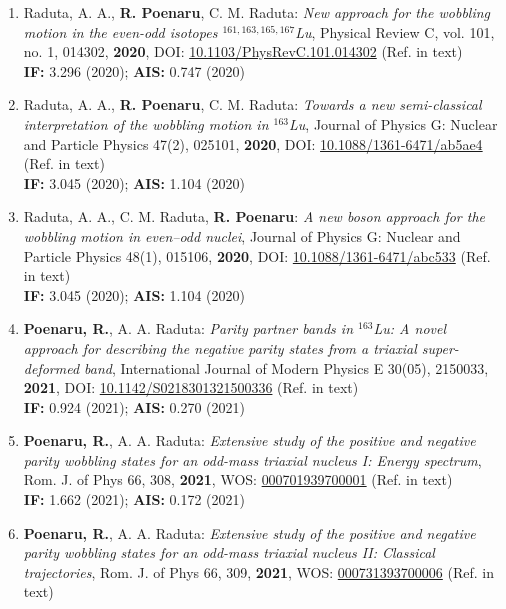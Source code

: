 \begin{enumerate}
    \item Raduta, A. A., \textbf{R. Poenaru}, C. M. Raduta: \emph{New approach for the wobbling motion in the even-odd isotopes $^{161,163,165,167}$Lu}, Physical Review C, vol. 101, no. 1, 014302, \textbf{2020}, DOI: \href{https://link.aps.org/doi/10.1103/PhysRevC.101.014302}{10.1103/PhysRevC.101.014302} (Ref. \cite{raduta2020approach} in text) \\
    \textbf{IF:} 3.296 (2020); \textbf{AIS:} 0.747 (2020)
    \item Raduta, A. A., \textbf{R. Poenaru}, C. M. Raduta: \emph{Towards a new semi-classical interpretation of the wobbling motion in $^{163}$Lu}, Journal of Physics G: Nuclear and Particle Physics 47(2), 025101, \textbf{2020}, DOI: \href{https://iopscience.iop.org/article/10.1088/1361-6471/ab5ae4/meta}{10.1088/1361-6471/ab5ae4} (Ref. \cite{raduta2020towards} in text) \\
    \textbf{IF:} 3.045 (2020); \textbf{AIS:} 1.104 (2020)
    \item Raduta, A. A., C. M. Raduta, \textbf{R. Poenaru}: \emph{A new boson approach for the wobbling motion in even–odd nuclei}, Journal of Physics G: Nuclear and Particle Physics 48(1), 015106, \textbf{2020}, DOI: \href{https://iopscience.iop.org/article/10.1088/1361-6471/abc533/meta}{10.1088/1361-6471/abc533} (Ref. \cite{raduta2020new} in text) \\
    \textbf{IF:} 3.045 (2020); \textbf{AIS:} 1.104 (2020)
    \item \textbf{Poenaru, R.}, A. A. Raduta: \emph{Parity partner bands in $^{163}$Lu: A novel approach for describing the negative parity states from a triaxial super-deformed band}, International Journal of Modern Physics E 30(05), 2150033, \textbf{2021}, DOI: \href{https://www.worldscientific.com/doi/abs/10.1142/S0218301321500336}{10.1142/S0218301321500336} (Ref. \cite{poenaru2021parity} in text) \\
    \textbf{IF:} 0.924 (2021); \textbf{AIS:} 0.270 (2021)
    \item \textbf{Poenaru, R.}, A. A. Raduta: \emph{Extensive study of the positive and negative parity wobbling states for an odd-mass triaxial nucleus I: Energy spectrum}, Rom. J. of Phys 66, 308, \textbf{2021}, WOS: \href{https://rjp.nipne.ro/2021_66_7-8/RomJPhys.66.308.pdf}{000701939700001} (Ref. \cite{poenaru2021extensive1} in text) \\
    \textbf{IF:} 1.662 (2021); \textbf{AIS:} 0.172 (2021)
    \item \textbf{Poenaru, R.}, A. A. Raduta: \emph{Extensive study of the positive and negative parity wobbling states for an odd-mass triaxial nucleus II: Classical trajectories}, Rom. J. of Phys 66, 309, \textbf{2021}, WOS: \href{https://rjp.nipne.ro/2021_66_9-10/RomJPhys.66.309.pdf}{000731393700006} (Ref. \cite{poenaru2021extensive2} in text) \\

\end{enumerate}
